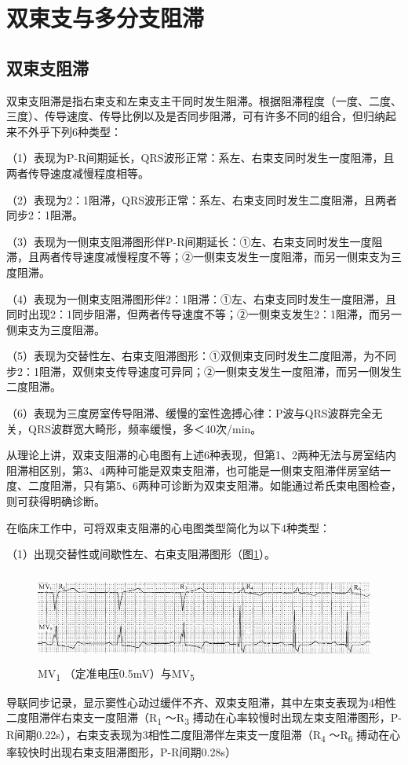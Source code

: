 \protect\hypertarget{text00028.htmlux5cux23subid349}{}{}

\section{双束支与多分支阻滞}

\protect\hypertarget{text00028.htmlux5cux23subid350}{}{}

\subsection{双束支阻滞}

双束支阻滞是指右束支和左束支主干同时发生阻滞。根据阻滞程度（一度、二度、三度）、传导速度、传导比例以及是否同步阻滞，可有许多不同的组合，但归纳起来不外乎下列6种类型：

（1）表现为P-R间期延长，QRS波形正常：系左、右束支同时发生一度阻滞，且两者传导速度减慢程度相等。

（2）表现为2：1阻滞，QRS波形正常：系左、右束支同时发生二度阻滞，且两者同步2：1阻滞。

（3）表现为一侧束支阻滞图形伴P-R间期延长：①左、右束支同时发生一度阻滞，且两者传导速度减慢程度不等；②一侧束支发生一度阻滞，而另一侧束支为三度阻滞。

（4）表现为一侧束支阻滞图形伴2：1阻滞：①左、右束支同时发生一度阻滞，且同时出现2：1同步阻滞，但两者传导速度不等；②一侧束支发生2：1阻滞，而另一侧束支为三度阻滞。

（5）表现为交替性左、右束支阻滞图形：①双侧束支同时发生二度阻滞，为不同步2：1阻滞，双侧束支传导速度可异同；②一侧束支发生一度阻滞，而另一侧发生二度阻滞。

（6）表现为三度房室传导阻滞、缓慢的室性逸搏心律：P波与QRS波群完全无关，QRS波群宽大畸形，频率缓慢，多＜40次/min。

从理论上讲，双束支阻滞的心电图有上述6种表现，但第1、2两种无法与房室结内阻滞相区别，第3、4两种可能是双束支阻滞，也可能是一侧束支阻滞伴房室结一度、二度阻滞，只有第5、6两种可诊断为双束支阻滞。如能通过希氏束电图检查，则可获得明确诊断。

在临床工作中，可将双束支阻滞的心电图类型简化为以下4种类型：

（1）出现交替性或间歇性左、右束支阻滞图形（图\ref{fig21-11}）。

\begin{figure}[!htbp]
 \centering
 \includegraphics[width=5.58333in,height=1.1875in]{./images/Image00359.jpg}
 \captionsetup{justification=centering}
 \caption{MV\textsubscript{1} （定准电压0.5mV）与MV\textsubscript{5}}
 \label{fig21-11}
  \end{figure} 
导联同步记录，显示窦性心动过缓伴不齐、双束支阻滞，其中左束支表现为4相性二度阻滞伴右束支一度阻滞（R\textsubscript{1}
～R\textsubscript{3}
搏动在心率较慢时出现左束支阻滞图形，P-R间期0.22s），右束支表现为3相性二度阻滞伴左束支一度阻滞（R\textsubscript{4}
～R\textsubscript{6} 搏动在心率较快时出现右束支阻滞图形，P-R间期0.28s）

